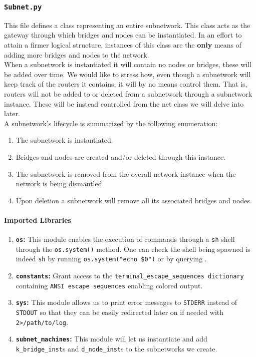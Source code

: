 \subsubsection{\texttt{Subnet.py}}
    This file defines a class representing an entire subnetwork. This class acts as the gateway through which bridges and nodes can be instantiated. In an effort to attain a firmer logical structure, instances of this class are the \textbf{only} means of adding more bridges and nodes to the network.\\

    When a subnetwork is instantiated it will contain no nodes or bridges, these will be added over time. We would like to stress how, even though a subnetwork will keep track of the routers it contains, it will by no means control them. That is, routers will not be added to or deleted from a subnetwork through a subnetwork instance. These will be instead controlled from the net class we will delve into later.\\

    A subnetwork's lifecycle is summarized by the following enumeration:\\

    \begin{enumerate}
        \item The subnetwork is instantiated.
        \item Bridges and nodes are created and/or deleted through this instance.
        \item The subnetwork is removed from the overall network instance when the network is being dismantled.
        \item Upon deletion a subnetwork will remove all its associated bridges and nodes.
    \end{enumerate}

    \paragraph{Imported Libraries}
        \begin{enumerate}
            \item \textbf{\texttt{os}:} This module enables the execution of commands through a \texttt{sh} shell through the \texttt{os.system()} method. One can check the shell being spawned is indeed \texttt{sh} by running \texttt{\allowbreak os.system("echo \$0")} or by querying \cite{bib:man-system}.
            \item \textbf{\texttt{constants}:} Grant access to the \texttt{\allowbreak terminal\_escape\_sequences dictionary} containing \texttt{ANSI escape sequences} enabling colored output.
            \item \textbf{\texttt{sys}:} This module allows us to print error messages to \texttt{STDERR} instead of \texttt{STDOUT} so that they can be easily redirected later on if needed with \texttt{2>/path/to/log}.
            \item \textbf{\texttt{subnet\_machines}:} This module will let us instantiate and add \texttt{k\_bridge\_inst}s and \texttt{d\_node\_inst}s to the subnetworks we create.
        \end{enumerate}

